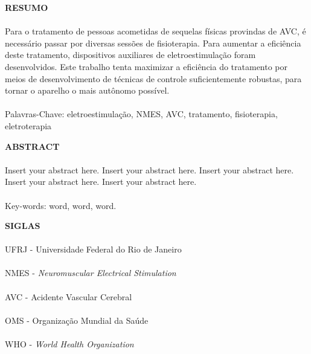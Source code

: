 \pagebreak


\begin{center}
	\textbf{RESUMO}
\end{center}
\vspace{0.5cm}

\paragraph{}Para o tratamento de pessoas acometidas de sequelas físicas provindas de AVC, é necessário passar por diversas sessões de fisioterapia. Para aumentar a eficiência deste tratamento, dispositivos auxiliares de eletroestimulação foram desenvolvidos. Este trabalho tenta maximizar a eficiência do tratamento por meios de desenvolvimento de técnicas de controle suficientemente robustas, para tornar o aparelho o mais autônomo possível.
\paragraph{}
\noindent Palavras-Chave: eletroestimulação, NMES, AVC, tratamento, fisioterapia, eletroterapia

\pagebreak


\begin{center}
	\textbf{ABSTRACT}
\end{center}
\vspace{0.5cm}

\paragraph{}Insert your abstract here. Insert your abstract here. Insert your abstract here. Insert your abstract here. Insert your abstract here.
\paragraph{}
\noindent Key-words: word, word, word.

\pagebreak


\begin{center}
	\textbf{SIGLAS}
\end{center}
\vspace{0.5cm}

\paragraph{}UFRJ - Universidade Federal do Rio de Janeiro 
\paragraph{}NMES - \textit{Neuromuscular Electrical Stimulation}
\paragraph{}AVC - Acidente Vascular Cerebral
\paragraph{}OMS - Organização Mundial da Saúde
\paragraph{}WHO - \textit{World Health Organization}

\pagebreak